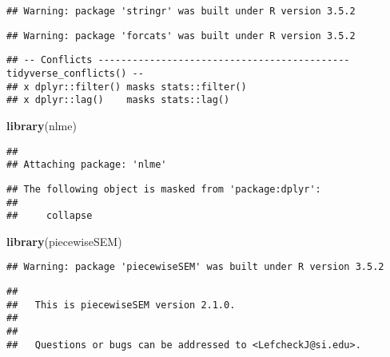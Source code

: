 \documentclass[]{article}
\newenvironment{Shaded}{\begin{snugshade}}{\end{snugshade}}
\newcommand{\KeywordTok}[1]{\textcolor[rgb]{0.13,0.29,0.53}{\textbf{#1}}}
\newcommand{\DataTypeTok}[1]{\textcolor[rgb]{0.13,0.29,0.53}{#1}}
\newcommand{\DecValTok}[1]{\textcolor[rgb]{0.00,0.00,0.81}{#1}}
\newcommand{\StringTok}[1]{\textcolor[rgb]{0.31,0.60,0.02}{#1}}
\newcommand{\CommentTok}[1]{\textcolor[rgb]{0.56,0.35,0.01}{\textit{#1}}}
\newcommand{\OperatorTok}[1]{\textcolor[rgb]{0.81,0.36,0.00}{\textbf{#1}}}
\newcommand{\NormalTok}[1]{#1}
\begin{document}
\begin{verbatim}
## Warning: package 'stringr' was built under R version 3.5.2
\end{verbatim}

\begin{verbatim}
## Warning: package 'forcats' was built under R version 3.5.2
\end{verbatim}

\begin{verbatim}
## -- Conflicts -------------------------------------------- tidyverse_conflicts() --
## x dplyr::filter() masks stats::filter()
## x dplyr::lag()    masks stats::lag()
\end{verbatim}

\begin{Shaded}
\begin{Highlighting}[]
\KeywordTok{library}\NormalTok{(nlme)}
\end{Highlighting}
\end{Shaded}

\begin{verbatim}
## 
## Attaching package: 'nlme'
\end{verbatim}

\begin{verbatim}
## The following object is masked from 'package:dplyr':
## 
##     collapse
\end{verbatim}

\begin{Shaded}
\begin{Highlighting}[]
\KeywordTok{library}\NormalTok{(piecewiseSEM)}
\end{Highlighting}
\end{Shaded}

\begin{verbatim}
## Warning: package 'piecewiseSEM' was built under R version 3.5.2
\end{verbatim}

\begin{verbatim}
## 
##   This is piecewiseSEM version 2.1.0.
## 
## 
##   Questions or bugs can be addressed to <LefcheckJ@si.edu>.
\end{verbatim}

\begin{Shaded}
\end{Shaded}
\end{document}
